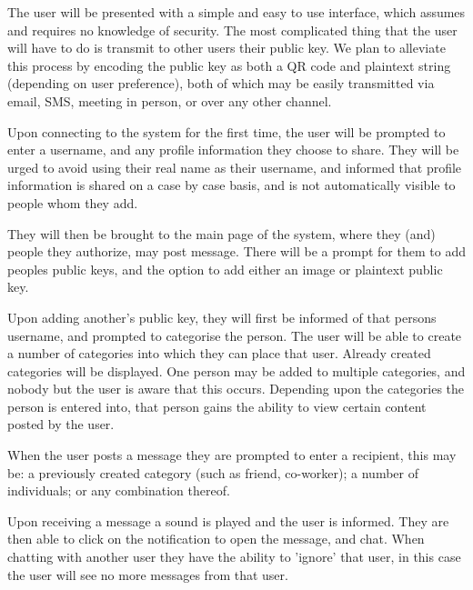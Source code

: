 The user will be presented with a simple and easy to use interface, which
assumes and requires no knowledge of security. The most complicated thing that
the user will have to do is transmit to other users their public key. We plan
to alleviate this process by encoding the public key as both a QR code and
plaintext string (depending on user preference), both of which may be easily
transmitted via email, SMS, meeting in person, or over any other channel.

Upon connecting to the system for the first time, the user will be prompted to
enter a username, and any profile information they choose to share. They will be
urged to avoid using their real name as their username, and informed that
profile information is shared on a case by case basis, and is not automatically
visible to people whom they add.

They will then be brought to the main page of the system, where they (and)
people they authorize, may post message. There will be a prompt for them to add
peoples public keys, and the option to add either an image or plaintext public
key.

Upon adding another's public key, they will first be informed of that persons
username, and prompted to categorise the person. The user will be able to create
a number of categories into which they can place that user. Already created
categories will be displayed. One person may be added to multiple categories,
and nobody but the user is aware that this occurs. Depending upon the categories
the person is entered into, that person gains the ability to view certain
content posted by the user.

When the user posts a message they are prompted to enter a recipient, this may
be: a previously created category (such as friend, co-worker); a number
of individuals; or any combination thereof.

Upon receiving a message a sound is played and the user is informed. They are
then able to click on the notification to open the message, and chat. When
chatting with another user they have the ability to 'ignore' that user, in this
case the user will see no more messages from that user.
